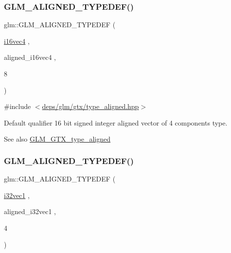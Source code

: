 \subsubsection{\texorpdfstring{G\+L\+M\+\_\+\+A\+L\+I\+G\+N\+E\+D\+\_\+\+T\+Y\+P\+E\+D\+E\+F()}{GLM\_ALIGNED\_TYPEDEF()}\hspace{0.1cm}{\footnotesize\ttfamily [60/209]}}
{\footnotesize\ttfamily glm\+::\+G\+L\+M\+\_\+\+A\+L\+I\+G\+N\+E\+D\+\_\+\+T\+Y\+P\+E\+D\+EF (\begin{DoxyParamCaption}\item[{\hyperlink{group__gtc__type__precision_ga99a249a4cc129cb527c48d3afd38b666}{i16vec4}}]{,  }\item[{aligned\+\_\+i16vec4}]{,  }\item[{8}]{ }\end{DoxyParamCaption})}



{\ttfamily \#include $<$\hyperlink{gtx_2type__aligned_8hpp}{deps/glm/gtx/type\+\_\+aligned.\+hpp}$>$}

Default qualifier 16 bit signed integer aligned vector of 4 components type. \begin{DoxySeeAlso}{See also}
\hyperlink{group__gtx__type__aligned}{G\+L\+M\+\_\+\+G\+T\+X\+\_\+type\+\_\+aligned} 
\end{DoxySeeAlso}
\mbox{\label{group__gtx__type__aligned_ga904e9c2436bb099397c0823506a0771f}} 
\subsubsection{\texorpdfstring{G\+L\+M\+\_\+\+A\+L\+I\+G\+N\+E\+D\+\_\+\+T\+Y\+P\+E\+D\+E\+F()}{GLM\_ALIGNED\_TYPEDEF()}\hspace{0.1cm}{\footnotesize\ttfamily [61/209]}}
{\footnotesize\ttfamily glm\+::\+G\+L\+M\+\_\+\+A\+L\+I\+G\+N\+E\+D\+\_\+\+T\+Y\+P\+E\+D\+EF (\begin{DoxyParamCaption}\item[{\hyperlink{group__gtc__type__precision_ga97351dd7f0ede9b8b79943f4adcd6a65}{i32vec1}}]{,  }\item[{aligned\+\_\+i32vec1}]{,  }\item[{4}]{ }\end{DoxyParamCaption})}




